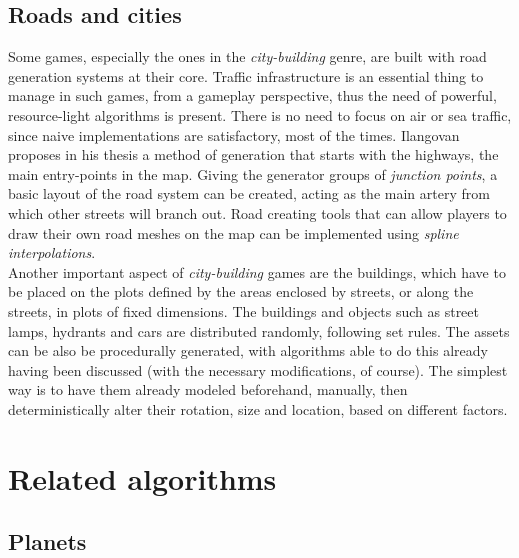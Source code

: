 \subsection{Roads and cities}

Some games, especially the ones in the \textit{city-building} genre, are built with road generation systems at their core. Traffic infrastructure is an essential thing to manage in such games, from a gameplay perspective, thus the need of powerful, resource-light algorithms is present. There is no need to focus on air or sea traffic, since naive implementations are satisfactory, most of the times. Ilangovan proposes in his thesis \cite{ilangovan2009procedural} a method of generation that starts with the highways, the main entry-points in the map. Giving the generator groups of \textit{junction points}, a basic layout of the road system can be created, acting as the main artery from which other streets will branch out. Road creating tools that can allow players to draw their own road meshes on the map can be implemented using \textit{spline interpolations}.\\

Another important aspect of \textit{city-building} games are the buildings, which have to be placed on the plots defined by the areas enclosed by streets, or along the streets, in plots of fixed dimensions. The buildings and objects such as street lamps, hydrants and cars are distributed randomly, following set rules. The assets can be also be procedurally generated, with algorithms able to do this already having been discussed (with the necessary modifications, of course). The simplest way is to have them already modeled beforehand, manually, then deterministically alter their rotation, size and location, based on different factors.

\section{Related algorithms}

\subsection{Planets}


